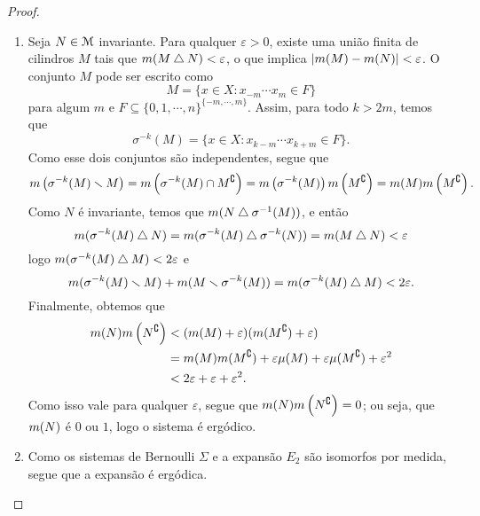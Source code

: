 \begin{proof}
\begin{enumerate}
	\item Seja $N \in \mathcal{M}$ invariante. Para qualquer $\varepsilon>0$, existe uma união finita de cilindros $M$ tais que $m(M \mathbin{\triangle} N)<\varepsilon$, o que implica $|m(M)-m(N)|<\varepsilon$. O conjunto $M$ pode ser escrito como
	\begin{equation*}
	M = \{x \in X: x_{-m}\cdots x_m \in F\}
	\end{equation*}
para algum $m$ e $F \subseteq \{0,1,\cdots,n\}^{\{-m,\cdots,m\}}$. Assim, para todo $k>2m$, temos que
	\begin{equation*}
	\sigma^{-k}(M)=\{x \in X: x_{k-m}\cdots x_{k+m} \in F\}.
	\end{equation*}
Como esse dois conjuntos são independentes, segue que
	\begin{equation*}
	m\left(\sigma^{-k}(M) \smallsetminus M\right) = m\left(\sigma^{-k}(M) \cap M^ \complement\right)=m\left(\sigma^{-k}(M)\right)m\left(M^\complement\right)=m(M)m\left(M^\complement\right).
	\end{equation*}
	Como $N$ é invariante, temos que $m(N \mathbin{\triangle} \sigma^{-1}(M))$, e então
	\begin{equation*}
	m(\sigma^{-k}(M) \mathbin{\triangle} N) =m(\sigma^{-k}(M) \mathbin{\triangle} \sigma^{-k}(N))=m(M \mathbin{\triangle} N)<\varepsilon
	\end{equation*}
logo $m(\sigma^{-k}(M) \mathbin{\triangle} M)<2\varepsilon$ e
	\begin{equation*}
	m(\sigma^{-k}(M) \smallsetminus M)+m(M \smallsetminus \sigma^{-k}(M)) = m(\sigma^{-k}(M) \mathbin{\triangle} M) < 2\varepsilon.
	\end{equation*}
Finalmente, obtemos que
	\begin{align*}
	m(N)m\left(N^\complement\right)&<(m(M)+\varepsilon)(m(M^\complement)+\varepsilon) \\
	&=m(M)m(M^\complement)+\varepsilon\mu(M)+\varepsilon\mu(M^\complement)+\varepsilon^2 \\
	&<2\varepsilon+\varepsilon+\varepsilon^2.
	\end{align*}
Como isso vale para qualquer $\varepsilon$, segue que $m(N)m\left(N^\complement\right)=0$; ou seja, que $m(N)$ é $0$ ou $1$, logo o sistema é ergódico.

	\item Como os sistemas de Bernoulli $\Sigma$ e a expansão $E_2$ são isomorfos por medida, segue que a expansão é ergódica.
\end{enumerate}
\end{proof}

